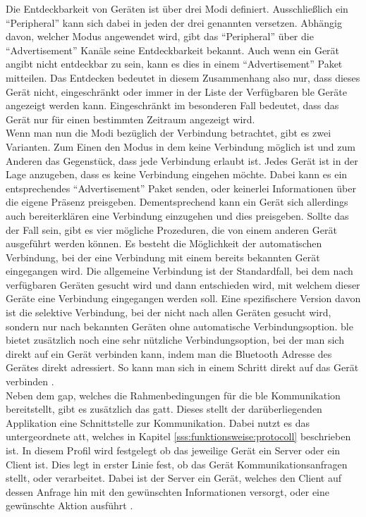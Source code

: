 \noindent Die Entdeckbarkeit von Geräten ist über drei Modi definiert. Ausschließlich ein "`Peripheral"' kann sich dabei in jeden der drei genannten versetzen. Abhängig davon, welcher Modus angewendet wird, gibt das "`Peripheral"' über die "`Advertisement"' Kanäle seine Entdeckbarkeit bekannt. Auch wenn ein Gerät angibt nicht entdeckbar zu sein, kann es dies in einem "`Advertisement"' Paket mitteilen. Das Entdecken bedeutet in diesem Zusammenhang also nur, dass dieses Gerät nicht, eingeschränkt oder immer in der Liste der Verfügbaren \ac{ble} Geräte angezeigt werden kann. Eingeschränkt im besonderen Fall bedeutet, dass das Gerät nur für einen bestimmten Zeitraum angezeigt wird.\\

\noindent Wenn man nun die Modi bezüglich der Verbindung betrachtet, gibt es zwei Varianten. Zum Einen den Modus in dem keine Verbindung möglich ist und zum Anderen das Gegenstück, dass jede Verbindung erlaubt ist. Jedes Gerät ist in der Lage anzugeben, dass es keine Verbindung eingehen möchte. Dabei kann es ein entsprechendes "`Advertisement"' Paket senden, oder keinerlei Informationen über die eigene Präsenz preisgeben. Dementsprechend kann ein Gerät sich allerdings auch bereiterklären eine Verbindung einzugehen und dies preisgeben. Sollte das der Fall sein, gibt es vier mögliche Prozeduren, die von einem anderen Gerät ausgeführt werden können. Es besteht die Möglichkeit der automatischen Verbindung, bei der eine Verbindung mit einem bereits bekannten Gerät eingegangen wird. Die allgemeine Verbindung ist der Standardfall, bei dem nach verfügbaren Geräten gesucht wird und dann entschieden wird, mit welchem dieser Geräte eine Verbindung eingegangen werden soll. Eine spezifischere Version davon ist die selektive Verbindung, bei der nicht nach allen Geräten gesucht wird, sondern nur nach bekannten Geräten ohne automatische Verbindungsoption. \ac{ble} bietet zusätzlich noch eine sehr nützliche Verbindungsoption, bei der man sich direkt auf ein Gerät verbinden kann, indem man die Bluetooth Adresse des Gerätes direkt adressiert. So kann man sich in einem Schritt direkt auf das Gerät verbinden \cite[Seite 38ff]{Townsend14:GSB}.\\      

\noindent Neben dem \ac{gap}, welches die Rahmenbedingungen für die \ac{ble} Kommunikation bereitstellt, gibt es zusätzlich das \ac{gatt}. Dieses stellt der darüberliegenden Applikation eine Schnittstelle zur Kommunikation. Dabei nutzt es das untergeordnete \ac{att}, welches in Kapitel \ref{sss:funktionsweise:protocoll} beschrieben ist. In diesem Profil wird festgelegt ob das jeweilige Gerät ein Server oder ein Client ist. Dies legt in erster Linie fest, ob das Gerät Kommunikationsanfragen stellt, oder verarbeitet. Dabei ist der Server ein Gerät, welches den Client auf dessen Anfrage hin mit den gewünschten Informationen versorgt, oder eine gewünschte Aktion ausführt \cite[Seite 30]{Usama17:BBS}.\\

